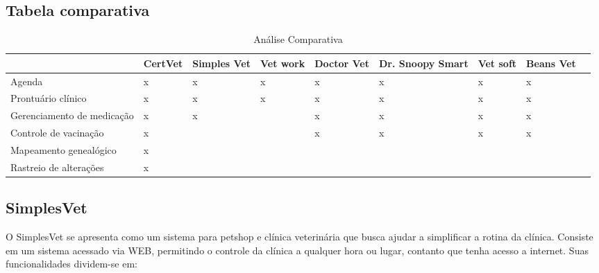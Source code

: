 \documentclass[
    12pt,               %
    openright,          %
    oneside,
    a4paper,            %
    BIBLATEX,           %
    TODO,               %
    english,            %
    brazil              %
    ]{ifsp-spo-inf-ctds}
\begin{document}
\subsection{Tabela comparativa}
\begin{center}
    \begin{table}[H]
    \begin{tabulary}{1.0\textwidth}{|L|L|L|L|L|L|L|L|L|}
    \hline
     & CertVet & Simples Vet & Vet work & Doctor Vet & Dr. Snoopy Smart & Vet soft & Beans Vet\\
    \hline
    Agenda & x & x & x & x & x & x & x\\
    \hline
    Prontuário clínico & x & x & x & x & x & x & x\\
    \hline
    Gerenciamento de medicação & x & x &  & x & x & x & x\\
    \hline
    Controle de vacina\c{c}ão & x &  &  & x & x & x & x\\
    \hline
    Mapeamento genealógico & x &  &  &  &  &  & \\
    \hline
    Rastreio de alterações & x &  &  &  &  &  & \\
    \hline
    \end{tabulary}
    \caption{Análise Comparativa}
    \label{tab:comparativa}
    \end{table}
\end{center}

\subsection{SimplesVet}
O SimplesVet se apresenta como um sistema para petshop e clínica veterinária que busca ajudar a simplificar a rotina da clínica. Consiste em um sistema acessado via WEB, permitindo o controle da clínica a qualquer hora ou lugar, contanto que tenha acesso a internet. Suas funcionalidades dividem-se em:
\end{document}
